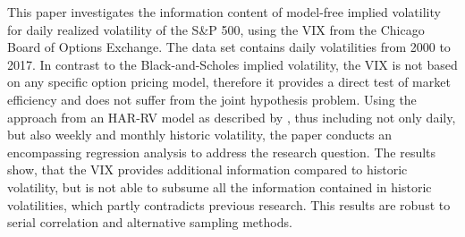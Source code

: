 
This paper investigates the information content of model-free implied volatility for daily realized volatility of the S\&P 500, using the \ac{VIX} from the Chicago Board of Options Exchange. The data set contains daily volatilities from 2000 to 2017. In contrast to the Black-and-Scholes implied volatility, the VIX is not based on any specific option pricing model, therefore it provides a direct test of market efficiency and does not suffer from the joint hypothesis problem. Using the approach from an HAR-RV model as described by \textcite{corsi2009}, thus including not only daily, but also weekly and monthly historic volatility, the paper conducts an encompassing regression analysis to address the research question. The results show, that the VIX provides additional information compared to historic volatility, but is not able to subsume all the information contained in historic volatilities, which partly contradicts previous research. This results are robust to serial correlation and alternative sampling methods. 